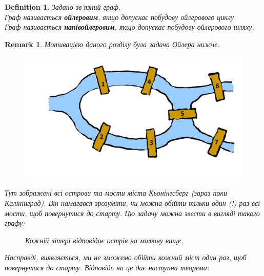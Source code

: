 \documentclass[a4paper, 14pt]{extarticle}
\theoremstyle{theoremdd}
\theoremstyle{theoremdd}
\newtheorem{definition}[theorem]{Definition}
\theoremstyle{theoremdd}
\theoremstyle{theoremdd}
\theoremstyle{theoremdd}
\theoremstyle{theoremdd}
\theoremstyle{theoremdd}
\theoremstyle{theoremdd}
\theoremstyle{theoremdd}
\theoremstyle{theoremdd}
\theoremstyle{theoremdd}
\newtheorem{remark}[theorem]{Remark}
\theoremstyle{theoremdd}
\theoremstyle{theoremdd}
\theoremstyle{theoremdd}
\theoremstyle{theoremdd}
\begin{document}
\begin{definition}
Задано зв'язний граф.\\
Граф називається \textbf{ойлеровим}, якщо допускає побудову ойлерового циклу.\\
Граф називається \textbf{напівойлеровим}, якщо допускає побудову ойлерового шляху.
\end{definition}

\begin{remark}
Мотивацією даного розділу була задача Ойлера нижче.
\begin{figure}[H]
\centering
\includegraphics[scale=0.3]{Koningsberg_bridge_problem}
\end{figure}
Тут зображені всі острови та мости міста Кьонінгсберг (зараз поки Калінінград). Він намагався зрозуміти, чи можна обійти тільки один (!) раз всі мости, щоб повернутися до старту. Цю задачу можна звести в вигляді такого графу:
\begin{figure}[H]
\centering
{}
\caption*{Кожній літері відповідає острів на малюну вище.}
\end{figure}
Насправді, виявляється, ми не зможемо обійти кожний міст один раз, щоб повернутися до старту. Відповідь на це дає наступна теорема:
\end{remark}
\end{document}
